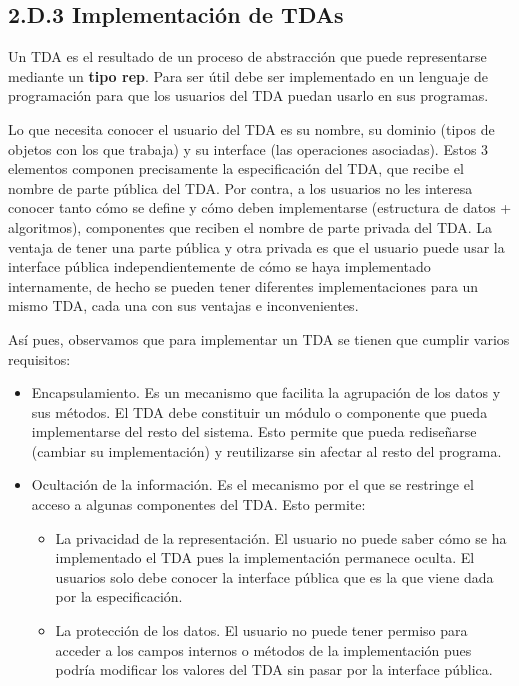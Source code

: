 \subsection*{2.D.3 Implementación de TDAs}




Un TDA es el resultado de un proceso de abstracción que puede representarse mediante un \textbf{tipo rep}. Para ser útil debe ser implementado en un lenguaje de programación para que los usuarios del TDA puedan usarlo en sus programas. 

Lo que necesita conocer el usuario del TDA es su nombre, su dominio (tipos de objetos con los que trabaja) y su interface (las operaciones asociadas). Estos 3 elementos componen precisamente la especificación del TDA, que recibe el nombre de parte pública del TDA. Por contra, a los usuarios no les interesa conocer tanto cómo se define y cómo deben implementarse (estructura de datos + algoritmos), componentes que reciben el nombre de parte privada del TDA. 
La ventaja de tener una parte pública y otra privada es que el usuario puede usar la interface pública independientemente de cómo se haya implementado internamente, de hecho se pueden tener diferentes implementaciones para un mismo TDA, cada una con sus ventajas e inconvenientes.

Así pues, observamos que para implementar un TDA se tienen que cumplir varios requisitos:

\begin{itemize}

\item Encapsulamiento. 	Es un mecanismo que facilita la agrupación de los datos y sus métodos.   El TDA debe constituir un módulo o componente que pueda implementarse del resto del sistema. Esto permite que pueda rediseñarse (cambiar su implementación) y reutilizarse sin afectar al resto del programa.

\item Ocultación de la información. Es el mecanismo por el que se restringe el acceso a   algunas componentes del TDA. Esto permite:

\begin{itemize}

\item La privacidad de la representación. El usuario no puede saber cómo se ha implementado el TDA pues la implementación permanece oculta. El usuarios solo debe conocer la interface pública que es la que viene dada por la especificación.

\item La protección de los datos. El usuario no puede tener permiso para acceder a los campos internos o métodos de la implementación pues podría modificar los valores del TDA sin pasar por la interface pública.
\end{itemize}

\end{itemize}


